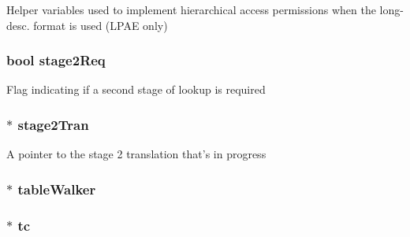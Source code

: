 \label{classArmISA_1_1TableWalker_1_1WalkerState_aa8accf2e55a1d194420c61e85b53efb5}
Helper variables used to implement hierarchical access permissions when the long-\/desc. format is used (LPAE only) \hypertarget{classArmISA_1_1TableWalker_1_1WalkerState_a52120124577a3b7c28a4e8876cd36a8b}{
\subsubsection[{stage2Req}]{\setlength{\rightskip}{0pt plus 5cm}bool {\bf stage2Req}}}
\label{classArmISA_1_1TableWalker_1_1WalkerState_a52120124577a3b7c28a4e8876cd36a8b}
Flag indicating if a second stage of lookup is required \hypertarget{classArmISA_1_1TableWalker_1_1WalkerState_ab65d5f856546ee4e3a9610df9672d39a}{
\subsubsection[{stage2Tran}]{$\ast$ {\bf stage2Tran}}}
\label{classArmISA_1_1TableWalker_1_1WalkerState_ab65d5f856546ee4e3a9610df9672d39a}
A pointer to the stage 2 translation that's in progress \hypertarget{classArmISA_1_1TableWalker_1_1WalkerState_ae4dec2d4d5730361d51d9f4b24dee89c}{
\subsubsection[{tableWalker}]{$\ast$ {\bf tableWalker}}}
\label{classArmISA_1_1TableWalker_1_1WalkerState_ae4dec2d4d5730361d51d9f4b24dee89c}
\hypertarget{classArmISA_1_1TableWalker_1_1WalkerState_a4455a4759e69e5ebe68ae7298cbcc37d}{
\subsubsection[{tc}]{$\ast$ {\bf tc}}}

